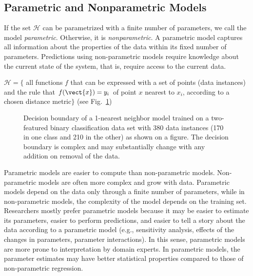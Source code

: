 \begin{refsection}
\subsection*{Parametric and Nonparametric Models}

If the set $\mathcal{H}$ can be parametrized with a finite number of parameters, we call the model {\em parametric}. Otherwise, it is {\em nonparametric}. A parametric model captures all information about the properties of the data within its fixed number of parameters. Predictions using non-parametric models require knowledge about the current state of the system, that is, require access to the current data.

\begin{example}
$\mathcal{H} = \lbrace$ all functions $f$ that can be expressed with a set of points (data instances) and the rule that $f(\vect{x}) = y_i$ of point $x$ nearest to $x_i$, according to a chosen distance metric$\rbrace$ (see Fig.~\ref{fig:1-nn})
\end{example}

\begin{figure}[htbp]
\label{fig:1-nn}
\caption{Decision boundary of a 1-nearest neighbor model trained on a two-featured binary classification data set with 380 data instances (170 in one class and 210 in the other) as shown on a figure. The decision boundary is complex and may substantially change with any addition on removal of the data.}
\end{figure}

Parametric models are easier to compute than non-parametric models. Non-parametric models are often more complex and grow with data. Parametric models depend on the data only through a finite number of parameters, while in non-parametric models, the complexity of the model depends on the training set. Researchers mostly prefer parametric models because it may be easier to estimate its parameters, easier to perform predictions, and easier to tell a story about the data according to a parametric model (e.g., sensitivity analysis, effects of the changes in parameters, parameter interactions). In this sense, parametric models are more prone to interpretation by domain experts. In parametric models, the parameter estimates may have better statistical properties compared to those of non-parametric regression.


\end{refsection}
